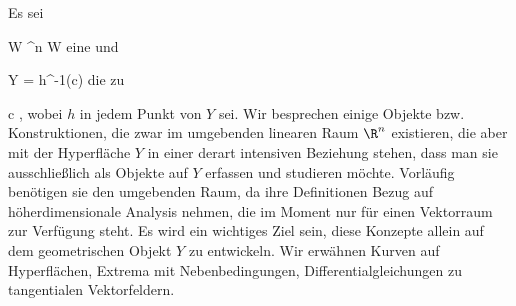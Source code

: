 
Es sei

\mavergleichskette
{\vergleichskette
{ W
}
{ \subseteq }{ \R^n
}
{  }{
}
{    }{
}
{   }{
}
}
{}{}{}
 { W } { \R
} {}
eine
und

\mavergleichskette
{\vergleichskette
{ Y
}
{ = }{ h^{-1}(c)
}
{  }{
}
{    }{
}
{   }{
}
}
{}{}{}
die
zu

\mavergleichskette
{\vergleichskette
{ c
}
{ \in }{ \R
}
{  }{
}
{    }{
}
{   }{
}
}
{}{}{,}
wobei $h$ in jedem Punkt von $Y$
sei. Wir besprechen einige Objekte bzw. Konstruktionen, die zwar im umgebenden linearen Raum $\R^n$ existieren, die aber mit der Hyperfläche $Y$ in einer derart intensiven Beziehung stehen, dass man sie ausschließlich als Objekte auf $Y$ erfassen und studieren möchte. Vorläufig benötigen sie den umgebenden Raum, da ihre Definitionen Bezug auf höherdimensionale Analysis nehmen, die im Moment nur für einen
 {} {} Vektorraum zur Verfügung steht. Es wird ein wichtiges Ziel sein, diese Konzepte allein auf dem
 {} {}
geometrischen Objekt $Y$ zu entwickeln. Wir erwähnen Kurven auf Hyperflächen, Extrema mit Nebenbedingungen, Differentialgleichungen zu tangentialen Vektorfeldern.

